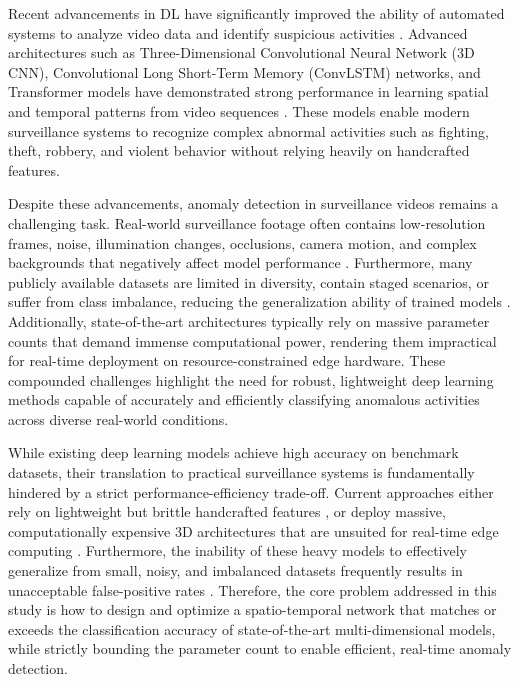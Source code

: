 \documentclass[11pt,a4paper]{article}
\begin{document}
	Recent advancements in DL have significantly improved the ability of automated 
	systems to analyze video data and identify suspicious activities \cite{ozyer2021,
	khan2022}. Advanced architectures such as Three-Dimensional Convolutional Neural
	Network (3D CNN), Convolutional Long Short-Term Memory (ConvLSTM) networks,
	and Transformer models have demonstrated strong performance in learning spatial
	and temporal patterns from video sequences \cite{vrskova2022, challa2021}. These
	models enable modern surveillance systems to recognize complex abnormal activities
	such as fighting, theft, robbery, and violent behavior without relying heavily on
	handcrafted features.

	Despite these advancements, anomaly detection in surveillance videos remains a
	challenging task. Real-world surveillance footage often contains low-resolution
	frames, noise, illumination changes, occlusions, camera motion, and complex
	backgrounds that negatively affect model performance \cite{sunil2021, vrskova2022}.
	Furthermore, many publicly available datasets are limited in diversity, contain
	staged scenarios, or suffer from class imbalance, reducing the generalization
	ability of trained models \cite{cheng2020, arshad2022}. Additionally, state-of-the-art 
	architectures typically rely on massive parameter counts that demand immense 
	computational power, rendering them impractical for real-time deployment on 
	resource-constrained edge hardware. These compounded challenges highlight
	the need for robust, lightweight deep learning methods capable of accurately and 
	efficiently classifying anomalous activities across diverse real-world conditions.

	While existing deep learning models achieve high accuracy on benchmark datasets, 
	their translation to practical surveillance systems is fundamentally hindered by 
	a strict performance-efficiency trade-off. Current approaches either rely on 
	lightweight but brittle handcrafted features \cite{arshad2022}, or deploy massive, 
	computationally expensive 3D architectures that are unsuited for real-time edge 
	computing \cite{sunil2021}. Furthermore, the inability of these heavy models to 
	effectively generalize from small, noisy, and imbalanced datasets frequently 
	results in unacceptable false-positive rates \cite{vrskova2022, dirgova2022, isik2026}. 
	Therefore, the core problem addressed in this study is how to design and optimize 
	a spatio-temporal network that matches or exceeds the classification accuracy of 
	state-of-the-art multi-dimensional models, while strictly bounding the parameter 
	count to enable efficient, real-time anomaly detection.
\end{document}
